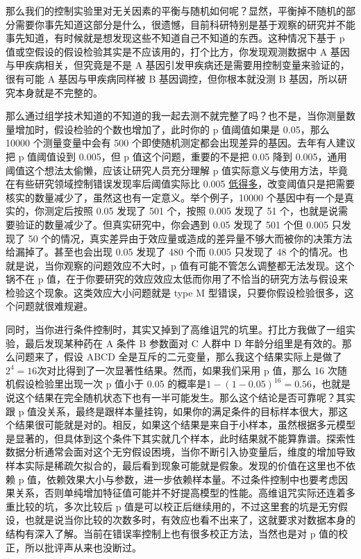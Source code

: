 \documentclass[]{tufte-book}
\begin{document}
那么我们的控制实验里对无关因素的平衡与随机如何呢？显然，平衡掉不随机的部分需要你事先知道这部分是什么，很遗憾，目前科研特别是基于观察的研究并不能事先知道，有时候就是想发现这些不知道自己不知道的东西。这种情况下基于 p 值或空假设的假设检验其实是不应该用的，打个比方，你发现观测数据中 A 基因与甲疾病相关，但究竟是不是 A 基因引发甲疾病还是需要用控制变量来验证的，很有可能 A 基因与甲疾病同样被 B 基因调控，但你根本就没测 B 基因，所以研究本身就是不完整的。

那么通过组学技术知道的不知道的我一起去测不就完整了吗？也不是，当你测量数量增加时，假设检验的个数也增加了，此时你的 p 值阈值如果是 0.05，那么 10000 个测量变量中会有 500 个即使随机测定都会出现差异的基因。去年有人建议把 p 值阈值设到 0.005，但 p 值这个问题，重要的不是把 0.05 降到 0.005，通用阈值这个想法太偷懒，应该让研究人员充分理解 p 值实际意义与使用方法，毕竟在有些研究领域控制错误发现率后阈值实际比 0.005 \href{http://www.nature.com/news/one-size-fits-all-threshold-for-p-values-under-fire-1.22625}{低得多}，改变阈值只是把需要核实的数量减少了，虽然这也有一定意义。举个例子，10000 个基因中有一个是真实的，你测定后按照 0.05 发现了 501 个，按照 0.005 发现了 51 个，也就是说需要验证的数量减少了。但真实研究中，你会遇到 0.05 发现了 501 个但 0.005 只发现了 50 个的情况，真实差异由于效应量或造成的差异量不够大而被你的决策方法给漏掉了。甚至也会出现 0.05 发现了 480 个而 0.005 只发现了 48 个的情况。也就是说，当你观察的问题效应不大时，p 值有可能不管怎么调整都无法发现。这个锅不在 p 值，在于你要研究的效应效应太低而你用了不恰当的研究方法与假设来检验这个现象。这类效应大小问题就是 type M 型错误，只要你假设检验很多，这个问题就很难规避。

同时，当你进行条件控制时，其实又掉到了高维诅咒的坑里。打比方我做了一组实验，最后发现某种药在 A 条件 B 参数面对 C 人群中 D 年龄分组里是有效的。那么问题来了，假设 ABCD 全是互斥的二元变量，那么我这个结果实际上是做了\(2^4 = 16\)次对比得到了一次显著性结果。然而，如果我们采用 p 值，那么 16 次随机假设检验里出现一次 p 值小于 0.05 的概率是\(1-(1-0.05)^{16} = 0.56\)，也就是说这个结果在完全随机状态下也有一半可能发生。那么这个结论是否可靠呢？其实跟 p 值没关系，最终是跟样本量挂钩，如果你的满足条件的目标样本很大，那这个结果很可能就是对的。相反，如果这个结果是来自于小样本，虽然根据多元模型是显著的，但具体到这个条件下其实就几个样本，此时结果就不能算靠谱。探索性数据分析通常会面对这个无穷假设困境，当你不断引入协变量后，维度的增加导致样本实际是稀疏欠拟合的，最后看到现象可能就是假象。发现的价值在这里也不依赖 p 值，依赖效果大小与参数，进一步依赖样本量。不过条件控制中也要考虑因果关系，否则单纯增加特征值可能并不好提高模型的性能。高维诅咒实际还连着多重比较的坑，多次比较后 p 值是可以校正后继续用的，不过这里套的坑是无穷假设，也就是说当你比较的次数多时，有效应也看不出来了，这就要求对数据本身的结构有深入了解。当前在错误率控制上也有很多校正方法，当然也是对 p 值的校正，所以批评声从来也没断过。
\end{document}
